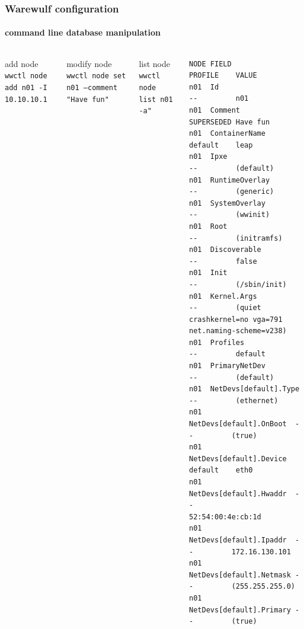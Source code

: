 \documentclass[aspectratio=169]{beamer}
\begin{document}
\begin{frame}[fragile]
\frametitle{Warewulf configuration}
\framesubtitle{command line database manipulation}
\begin{columns}
\begin{block}{add node}
\texttt{wwctl node add n01 -I 10.10.10.1}
\end{block}
\begin{block}{modify node}
\texttt{wwctl node set n01 --comment "Have fun"}
\end{block}
\begin{block}{list node}
\texttt{wwctl node list n01 -a"}
\end{block}
\vspace*{3cm}
\begin{lstlisting}[style=mystyle]
NODE FIELD                    PROFILE    VALUE
n01  Id                       --         n01
n01  Comment                  SUPERSEDED Have fun
n01  ContainerName            default    leap
n01  Ipxe                     --         (default)
n01  RuntimeOverlay           --         (generic)
n01  SystemOverlay            --         (wwinit)
n01  Root                     --         (initramfs)
n01  Discoverable             --         false
n01  Init                     --         (/sbin/init)
n01  Kernel.Args              --         (quiet crashkernel=no vga=791 net.naming-scheme=v238)
n01  Profiles                 --         default
n01  PrimaryNetDev            --         (default)
n01  NetDevs[default].Type    --         (ethernet)
n01  NetDevs[default].OnBoot  --         (true)
n01  NetDevs[default].Device  default    eth0
n01  NetDevs[default].Hwaddr  --         52:54:00:4e:cb:1d
n01  NetDevs[default].Ipaddr  --         172.16.130.101
n01  NetDevs[default].Netmask --         (255.255.255.0)
n01  NetDevs[default].Primary --         (true)
\end{lstlisting}
\end{columns}
\end{frame}
\end{document}
